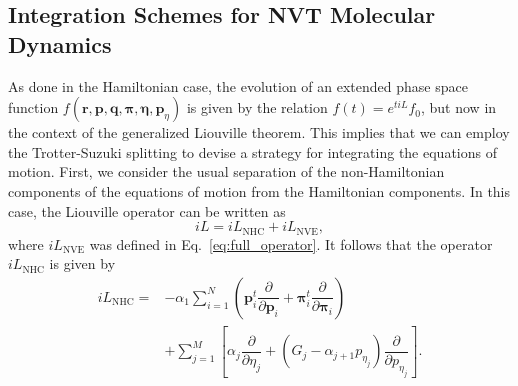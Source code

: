 \documentclass[aip,jcp,reprint,amsmath,amssymb,amsfont]{revtex4-1}
\newcommand{\vt}[1]{\boldsymbol{\mathbf{#1}}}           %
\newcommand{\tr}[1]{#1^t}                               %
\newcommand{\diff}[2]{\dfrac{\partial #1}{\partial #2}} %
\begin{document}
\subsection{Integration Schemes for NVT Molecular Dynamics}

As done in the Hamiltonian case, the evolution of an extended phase space function $f(\vt r, \vt p, \vt q, \vt \pi, \vt \eta,{\vt p}_\eta)$ is given by the relation $f(t) = e^{t i\!L}f_0$, but now in the context of the generalized Liouville theorem.\cite{Tuckerman_1999} This implies that we can employ the Trotter-Suzuki splitting to devise a strategy for integrating the equations of motion. First, we consider the usual separation of the non-Hamiltonian components of the equations of motion from the Hamiltonian components. In this case, the Liouville operator can be written as
\[
i\!L = i\!L_\text{NHC} + i\!L_\text{NVE},
\]
where $i\!L_\text{NVE}$ was defined in Eq.~\ref{eq:full_operator}. It follows that the operator $i\!L_\text{NHC}$ is given by
\begin{equation}
\begin{split}
i\!L_\text{NHC} = &-\alpha_1 \sum_{i=1}^N \left( \tr{\vt p}_i \diff{}{\vt p_i} + \tr{\vt \pi}_i \diff{}{\vt \pi_i}\right) \\
&+ \sum_{j=1}^M \left[ \alpha_j \diff{}{\eta_j} + (G_j - \alpha_{j+1} p_{\eta_j}) \diff{}{p_{\eta_j}} \right].
\end{split}
\end{equation}
\end{document}
